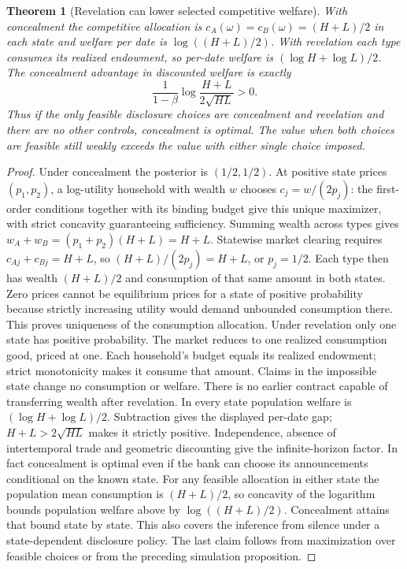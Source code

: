 \documentclass[11pt]{article}
\newtheorem{theorem}{Theorem}
\theoremstyle{remark}
\begin{document}
\begin{theorem}[Revelation can lower selected competitive welfare]
With concealment the competitive allocation is
$c_A(\omega)=c_B(\omega)=(H+L)/2$ in each state and welfare per date
is $\log((H+L)/2)$. With revelation each type consumes its realized
endowment, so per-date welfare is $(\log H+\log L)/2$.
The concealment advantage in discounted welfare is exactly
\[
 \frac1{1-\beta}\log\frac{H+L}{2\sqrt{HL}}>0.
\]
Thus if the only feasible disclosure choices are concealment and
revelation and there are no other controls, concealment is optimal.
The value when both choices are feasible still weakly exceeds the value
with either single choice imposed.
\end{theorem}
\begin{proof}
Under concealment the posterior is $(1/2,1/2)$. At positive state prices
$(p_1,p_2)$, a log-utility household with wealth $w$ chooses
$c_j=w/(2p_j)$: the first-order conditions together with its binding
budget give this unique maximizer, with strict concavity guaranteeing
sufficiency. Summing wealth across types gives
$w_A+w_B=(p_1+p_2)(H+L)=H+L$. Statewise market clearing requires
$c_{Aj}+c_{Bj}=H+L$, so $(H+L)/(2p_j)=H+L$, or $p_j=1/2$.
Each type then has wealth $(H+L)/2$ and consumption of that same amount
in both states. Zero prices cannot be equilibrium prices for a state of
positive probability because strictly increasing utility would demand
unbounded consumption there. This proves uniqueness of the consumption
allocation.
Under revelation only one state has positive probability. The market
reduces to one realized consumption good, priced at one. Each household's
budget equals its realized endowment; strict monotonicity makes it consume
that amount. Claims in the impossible state change no consumption or
welfare. There is no earlier contract capable of transferring wealth
after revelation. In every state population welfare is
$(\log H+\log L)/2$. Subtraction gives the displayed per-date gap;
$H+L>2\sqrt{HL}$ makes it strictly positive. Independence, absence of
intertemporal trade and geometric discounting give the infinite-horizon
factor. In fact concealment is optimal even if the bank can choose its
announcements conditional on the known state. For any feasible allocation
in either state the population mean consumption is $(H+L)/2$, so concavity
of the logarithm bounds population welfare above by
$\log((H+L)/2)$. Concealment attains that bound state by state. This also
covers the inference from silence under a state-dependent disclosure
policy. The last claim follows from maximization over feasible choices
or from the preceding simulation proposition.
\end{proof}
\end{document}
